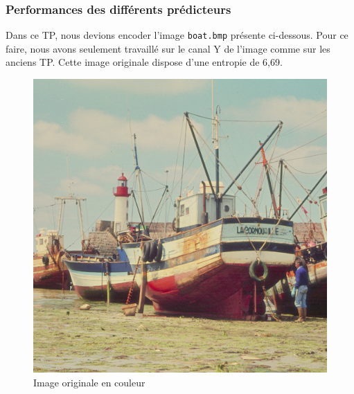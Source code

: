 \documentclass[12pt]{report}
\begin{document}
\subsubsection{Performances des différents prédicteurs}

Dans ce TP, nous devions encoder l'image \texttt{boat.bmp} présente ci-dessous. Pour ce faire, nous avons seulement travaillé sur le canal Y de l'image comme sur les anciens TP. Cette image originale dispose d'une entropie de 6,69.

\begin{figure}[H]
\begin{center}
\includegraphics[scale=0.4]{../boats.jpg} 
\caption{Image originale en couleur}
\end{center}
\end{figure}
\end{document}
